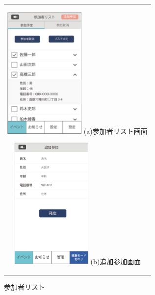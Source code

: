 \begin{figure}[htbp]
  \begin{center}
    \begin{tabular}{c}

      \begin{minipage}{0.33\hsize}
        \begin{center}
\includegraphics[width=4cm]{participant_list}
          \hspace{1cm} %
          {\footnotesize (a)参加者リスト画面}
        \end{center}
      \end{minipage}

      \begin{minipage}{0.33\hsize}
        \begin{center}
\includegraphics[width=4cm]{participant_add.png}
          \hspace{1cm}%
          {\footnotesize (b)追加参加画面}
        \end{center}
      \end{minipage}

    \end{tabular}
    \caption{参加者リスト}
    \label{fig:lena}
  \end{center}
\end{figure}


